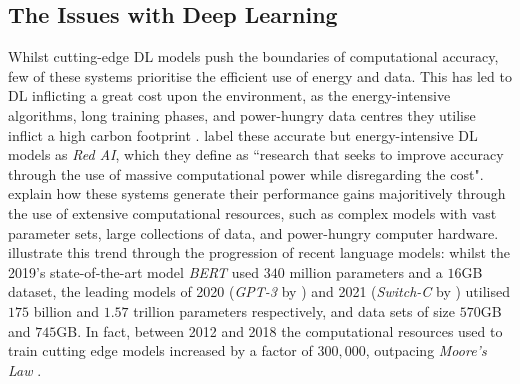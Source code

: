 \documentclass[a4paper, 11pt]{report}
\begin{document}
    \subsection{The Issues with Deep Learning}

    Whilst cutting-edge DL models push the boundaries of computational accuracy, few of these systems prioritise the efficient use of energy and data. This has led to DL inflicting a great cost upon the environment, as the energy-intensive algorithms, long training phases, and power-hungry data centres they utilise inflict a high carbon footprint \citep{lacoste-2019}. \citet{schwartz-2019} label these accurate but energy-intensive DL models as \emph{Red AI}, which they define as ``research that seeks to improve accuracy through the use of massive computational power while disregarding the cost". \citeauthor{schwartz-2019} explain how these systems generate their performance gains majoritively through the use of extensive computational resources, such as complex models with vast parameter sets, large collections of data, and power-hungry computer hardware. \citet{bender-2021} illustrate this trend through the progression of recent language models: whilst the 2019's state-of-the-art model \emph{BERT} \citep{devlin-2018} used $340$ million parameters and a $16$GB dataset, the leading models of 2020 (\emph{GPT-3} by \citet{brown-2020}) and 2021 (\emph{Switch-C} by \citet{fedus-2021}) utilised $175$ billion and $1.57$ trillion parameters respectively, and data sets of size $570$GB and $745$GB. In fact, between 2012 and 2018 the computational resources used to train cutting edge models increased by a factor of $300,000$, outpacing \emph{Moore's Law} \citep{amodei-2018}.
\end{document}
